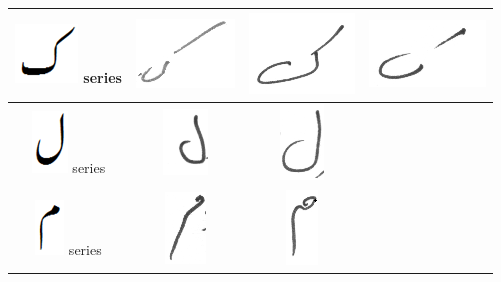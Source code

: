 \begin{table}[h]
\begin{tabular}{@{}cccc@{}}
\hline
\includegraphics[scale=0.15]{kaaf_orig} series & \includegraphics[scale=0.15]{kaaf2} & \includegraphics[scale=0.15]{kaaf3}  & 
\includegraphics[scale=0.15]{kaaf} \\
\hline
\includegraphics[scale=0.15]{Laam_orig} series & \includegraphics[scale=0.15]{laaam} & \includegraphics[scale=0.15]{laam2}  &  \\
\hline
\includegraphics[scale=0.15]{meem_orig} series & \includegraphics[scale=0.15]{meem} & \includegraphics[scale=0.15]{meem2}  &  \\

\end{tabular}
\end{table}

